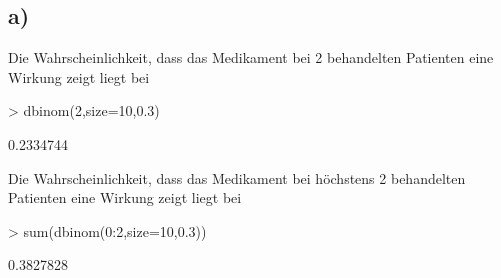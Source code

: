 \subsection*{a)}
Die Wahrscheinlichkeit, dass das Medikament bei 2 behandelten Patienten
eine Wirkung zeigt liegt bei
\begin{Schunk}
\begin{Sinput}
> dbinom(2,size=10,0.3)
\end{Sinput}
\begin{Soutput}
[1] 0.2334744
\end{Soutput}
\end{Schunk}
Die Wahrscheinlichkeit, dass das Medikament bei höchstens 2 behandelten 
Patienten eine Wirkung zeigt liegt bei
\begin{Schunk}
\begin{Sinput}
> sum(dbinom(0:2,size=10,0.3))
\end{Sinput}
\begin{Soutput}
[1] 0.3827828
\end{Soutput}
\end{Schunk}

